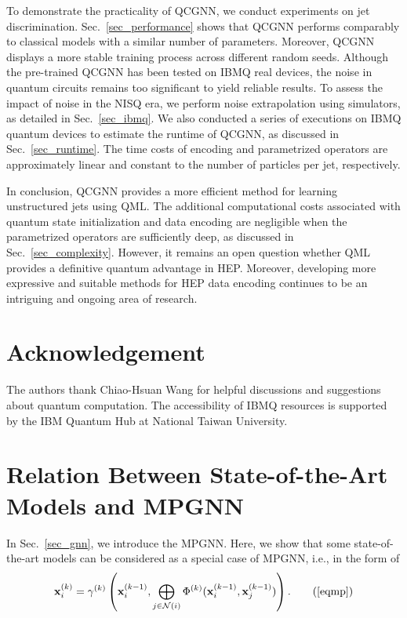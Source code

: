 \documentclass[reprint,amsmath,amssymb,prd,nofootinbib]{revtex4-2}
\def\xbf{\mathbf{x}}
\begin{document}
To demonstrate the practicality of QCGNN, we conduct experiments on jet discrimination. Sec.~\ref{sec_performance} shows that QCGNN performs comparably to classical models with a similar number of parameters. Moreover, QCGNN displays a more stable training process across different random seeds. Although the pre-trained QCGNN has been tested on IBMQ real devices, the noise in quantum circuits remains too significant to yield reliable results. To assess the impact of noise in the NISQ era, we perform noise extrapolation using simulators, as detailed in Sec.~\ref{sec_ibmq}. We also conducted a series of executions on IBMQ quantum devices to estimate the runtime of QCGNN, as discussed in Sec.~\ref{sec_runtime}. The time costs of encoding and parametrized operators are approximately linear and constant to the number of particles per jet, respectively.

In conclusion, QCGNN provides a more efficient method for learning unstructured jets using QML. The additional computational costs associated with quantum state initialization and data encoding are negligible when the parametrized operators are sufficiently deep, as discussed in Sec.~\ref{sec_complexity}. However, it remains an open question whether QML provides a definitive quantum advantage in HEP. Moreover, developing more expressive and suitable methods for HEP data encoding continues to be an intriguing and ongoing area of research.

\section*{Acknowledgement}

The authors thank Chiao-Hsuan Wang for helpful discussions and suggestions about quantum computation. The accessibility of IBMQ resources is supported by the IBM Quantum Hub at National Taiwan University.

\appendix

\section{Relation Between State-of-the-Art Models and MPGNN} \label{app_mpgnn}

In Sec.~\ref{sec_gnn}, we introduce the MPGNN. Here, we show that some state-of-the-art models can be considered as a special case of MPGNN, i.e., in the form of
\begin{equation}
    \xbf^{(k)}_i=\gamma^{(k)}\left(\xbf^{(k-1)}_i,\bigoplus_{j \in \mathcal{N}(i)}\Phi^{(k)}(\xbf^{(k-1)}_i,\xbf^{(k-1)}_j)\right).
    \tag{\ref{eqmp}}
\end{equation}
\end{document}

